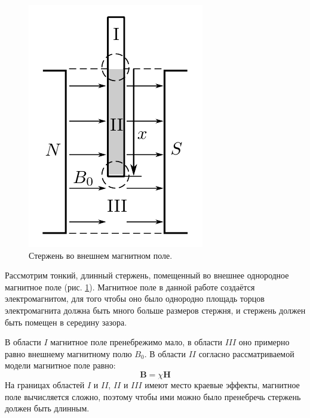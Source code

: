 \documentclass[12pt,a4paper]{article}
\begin{document}
	\begin{figure}
		\includegraphics[width=\linewidth]{res/rod.png}
		\caption{Стержень во внешнем магнитном поле.}
		\label{img:rod}
	\end{figure}
	
	Рассмотрим тонкий, длинный стержень, помещенный во внешнее однородное магнитное поле (рис. \ref{img:rod}). Магнитное поле в данной работе создаётся электромагнитом, для того чтобы оно было однородно площадь торцов электромагнита должна быть много больше размеров стержня, и стержень должен быть помещен в середину зазора.
	
	В области $I$ магнитное поле пренебрежимо мало, в области $III$ оно примерно равно внешнему магнитному полю $B_0$. В области $II$ согласно рассматриваемой модели магнитное поле равно:
	$$
	\boldsymbol{B} = \chi \boldsymbol{H}
	$$
	На границах областей $I$ и $II$, $II$ и $III$ имеют место краевые эффекты, магнитное поле вычисляется сложно, поэтому чтобы ими можно было пренебречь стержень должен быть длинным.
	
\end{document}
